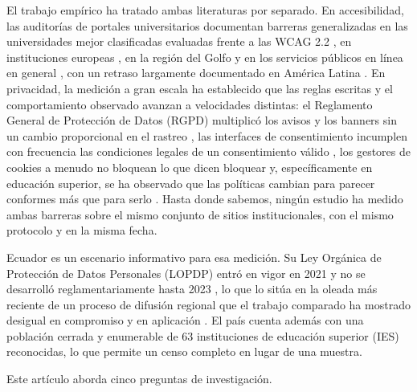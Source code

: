\documentclass[pdflatex,sn-basic,Numbered,iicol]{sn-jnl}
\theoremstyle{thmstyleone}
\theoremstyle{thmstyletwo}
\theoremstyle{thmstylethree}
\begin{document}
El trabajo emp\'irico ha tratado ambas literaturas por separado. En accesibilidad, las auditor\'ias de portales universitarios documentan barreras generalizadas en las universidades mejor clasificadas evaluadas frente a las WCAG 2.2 \citep{krittika2025accessibility}, en instituciones europeas \citep{krejtz2025higher}, en la regi\'on del Golfo \citep{fakrudeen2025evaluation} y en los servicios p\'ublicos en l\'inea en general \citep{aljedaani2025egovernment,iniesto2025service}, con un retraso largamente documentado en Am\'erica Latina \citep{campoverdemolina2023accessibility,acostavargas2020dataset}. En privacidad, la medici\'on a gran escala ha establecido que las reglas escritas y el comportamiento observado avanzan a velocidades distintas: el Reglamento General de Protecci\'on de Datos (RGPD) \citep{gdpr2016} multiplic\'o los avisos y los banners sin un cambio proporcional en el rastreo \citep{degeling2019value,trevisan2019four,kretschmer2021cookie}, las interfaces de consentimiento incumplen con frecuencia las condiciones legales de un consentimiento v\'alido \citep{matte2020cookie,nouwens2020dark,gray2021dark,habib2022okay}, los gestores de cookies a menudo no bloquean lo que dicen bloquear \citep{sanchezrola2019can,bollinger2022automating} y, espec\'ificamente en educaci\'on superior, se ha observado que las pol\'iticas cambian para parecer conformes m\'as que para serlo \citep{munot2025compliance}. Hasta donde sabemos, ning\'un estudio ha medido ambas barreras sobre el mismo conjunto de sitios institucionales, con el mismo protocolo y en la misma fecha.

Ecuador es un escenario informativo para esa medici\'on. Su Ley Org\'anica de Protecci\'on de Datos Personales (LOPDP) entr\'o en vigor en 2021 y no se desarroll\'o reglamentariamente hasta 2023 \citep{lopdp2021,reglamentolopdp2023}, lo que lo sit\'ua en la oleada m\'as reciente de un proceso de difusi\'on regional que el trabajo comparado ha mostrado desigual en compromiso y en aplicaci\'on \citep{carrillo2022follow,chavarriamora2025lack}. El pa\'is cuenta adem\'as con una poblaci\'on cerrada y enumerable de 63 instituciones de educaci\'on superior (IES) reconocidas, lo que permite un censo completo en lugar de una muestra.

Este art\'iculo aborda cinco preguntas de investigaci\'on.
\end{document}

